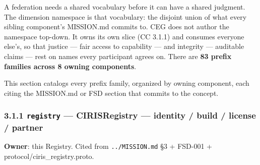 \documentclass[11pt]{article}
\begin{document}
A federation needs a shared vocabulary before it can have a shared judgment. The dimension namespace is that vocabulary: the disjoint union of what every sibling component's MISSION.md commits to. CEG does not author the namespace top-down. It owns its own slice (CC 3.1.1) and consumes everyone else's, so that justice — fair access to capability — and integrity — auditable claims — rest on names every participant agrees on. There are \textbf{83 prefix families across 8 owning components}.


This section catalogs every prefix family, organized by owning component, each citing the MISSION.md or FSD section that commits to the concept.


\subsubsection*{3.1.1 \texttt{registry} — CIRISRegistry — identity / build / license / partner}


\textbf{Owner}: this Registry. Cited from \texttt{../MISSION.md} §3 + FSD-001 + protocol/ciris\_registry.proto.
\end{document}
